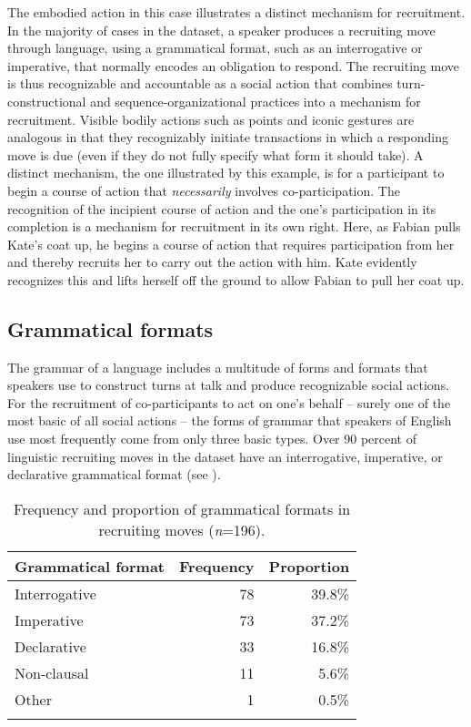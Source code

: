 \documentclass[output=paper,nonflat,modfont,draft]{langsci/langscibook}
\begin{document}
The embodied action in this case illustrates a distinct mechanism for recruitment. In the majority of cases in the dataset, a speaker produces a recruiting move through language, using a grammatical format, such as an interrogative or imperative, that normally encodes an obligation to respond. The recruiting move is thus recognizable and accountable as a social action that combines turn-constructional and sequence-organizational practices into a mechanism for recruitment. Visible bodily actions such as points and iconic gestures are analogous in that they recognizably initiate transactions in which a responding move is due (even if they do not fully specify what form it should take). A distinct mechanism, the one illustrated by this example, is for a participant to begin a course of action that \textit{necessarily} involves co-participation. The recognition of the incipient course of action and the one’s participation in its completion is a mechanism for recruitment in its own right. Here, as Fabian pulls Kate’s coat up, he begins a course of action that requires participation from her and thereby recruits her to carry out the action with him. Kate evidently recognizes this and lifts herself off the ground to allow Fabian to pull her coat up.

\subsection{Grammatical formats}\label{sec:kendrick:4.2}
The grammar of a language includes a multitude of forms and formats that speakers use to construct turns at talk and produce recognizable social actions. For the recruitment of co-participants to act on one’s behalf -- surely one of the most basic of all social actions -- the forms of grammar that speakers of English use most frequently come from only three basic types. Over 90 percent of linguistic recruiting moves in the dataset have an interrogative, imperative, or declarative grammatical format (see ).

\begin{table}
\begin{tabularx}{0.66\textwidth}{Xrr}
\lsptoprule
Grammatical format 	& Frequency	& Proportion \\
\midrule
Interrogative	& 78	& 39.8\%         \\
Imperative	& 73	& 37.2\%            \\
Declarative	& 33	& 16.8\%           \\
Non-clausal	& 11	& 5.6\%            \\
Other	& 1	& 0.5\%                   \\
\lspbottomrule
\end{tabularx}

\caption{Frequency and proportion of grammatical formats in recruiting moves (\textit{n}=196).}
\label{tab:kendrick:2}
\end{table}
\end{document}
